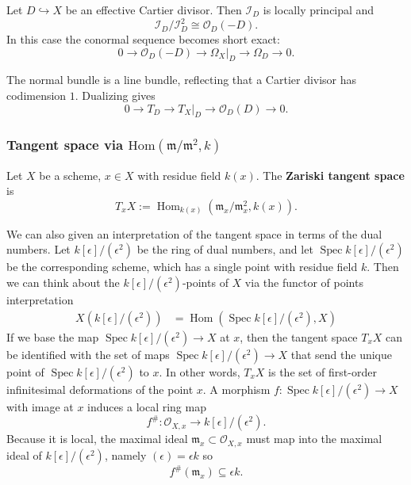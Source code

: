 \documentclass[12pt]{article}
\begin{document}
\begin{proposition}
    Let $D \hookrightarrow X$ be an effective Cartier divisor. Then $\mathcal I_D$ is locally principal and
    \[
        \mathcal I_D/\mathcal I_D^2 \cong \mathcal O_D(-D).
    \]
    In this case the conormal sequence becomes short exact:
    \[
        0 \longrightarrow \mathcal O_D(-D) \longrightarrow \Omega_X|_D \longrightarrow \Omega_D \longrightarrow 0.
    \]
\end{proposition}The normal bundle is a line bundle, reflecting that a Cartier divisor has codimension $1$.
Dualizing gives
\[
    0 \longrightarrow T_D \longrightarrow T_X|_D \longrightarrow \mathcal O_D(D) \longrightarrow 0.
\]

\subsubsection{Tangent space via $\mathrm{Hom}(\mathfrak m/\mathfrak m^2,k)$}

\begin{definition}
    Let $X$ be a scheme, $x \in X$ with residue field $k(x)$. The \textbf{Zariski tangent space} is
    \[
        T_x X := \operatorname{Hom}_{k(x)}(\mathfrak m_x/\mathfrak m_x^2, k(x)).
    \]
\end{definition}

We can also given an interpretation of the tangent space in terms of the dual numbers. Let $k[\epsilon]/(\epsilon^2)$ be the ring of dual numbers, and let $\operatorname{Spec} k[\epsilon]/(\epsilon^2)$ be the corresponding scheme, which has a single point with residue field $k$. Then we can think about the $k[\epsilon]/(\epsilon^2)$-points of $X$ via the functor of points interpretation \begin{align*}
    X(k[\epsilon]/(\epsilon^2)) & = \operatorname{Hom}(\operatorname{Spec} k[\epsilon]/(\epsilon^2), X)
\end{align*}
If we base the map \(\operatorname{Spec} k[\epsilon]/(\epsilon^2) \to X\) at \(x\), then the tangent space \(T_x X\) can be identified with the set of maps \(\operatorname{Spec} k[\epsilon]/(\epsilon^2) \to X\) that send the unique point of \(\operatorname{Spec} k[\epsilon]/(\epsilon^2)\) to \(x\). In other words, \(T_x X\) is the set of first-order infinitesimal deformations of the point \(x\). A morphism
$f:\operatorname{Spec} k[\epsilon]/(\epsilon^2)\to X$
with image at \(x\) induces a local ring map
\[
    f^\#:\mathcal O_{X,x}\to k[\epsilon]/(\epsilon^2).
\]
Because it is local, the maximal ideal \(\mathfrak m_x\subset \mathcal O_{X,x}\) must map into the maximal ideal of \(k[\epsilon]/(\epsilon^2)\), namely $(\epsilon)=\epsilon k$ so
\[
    f^\#(\mathfrak m_x)\subseteq \epsilon k.
\]
\end{document}
